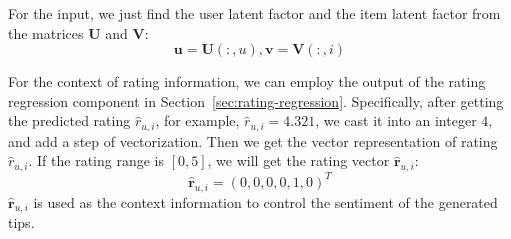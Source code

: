 \documentclass[sigconf]{acmart}
\begin{document}
For the input, we just find the user latent factor and the item latent factor from the matrices $\mathbf{U}$ and $\mathbf{V}$:
\begin{equation}
\mathbf{u}=\mathbf{U}(:,u), \mathbf{v}=\mathbf{V}(:,i)
\end{equation}

For the context of rating information, we can employ the output of the rating regression component in Section~\ref{sec:rating-regression}.
Specifically, after getting the predicted rating $\hat r_{u,i}$, for example, $\hat r_{u,i} = 4.321$, we cast it into an integer $4$, and add a step of vectorization. Then we get the vector representation of rating $\hat r_{u,i}$. If the rating range is $[0, 5]$, we will get the rating vector $ \mathbf{\hat r}_{u,i}$:
\begin{equation}
\mathbf{\hat r}_{u,i} = (0, 0, 0, 0, 1, 0)^T
\end{equation}
$ \mathbf{\hat r}_{u,i}$ is used as the context information to control the sentiment of the generated tips.
\end{document}
